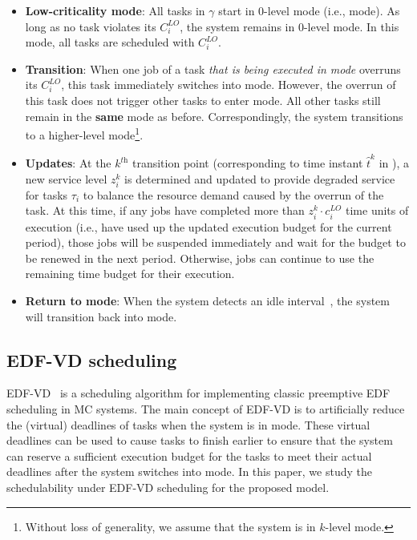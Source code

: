 \documentclass[10pt,journal,compsoc]{IEEEtran}
\begin{document}
\begin{itemize}
\item \textbf{Low-criticality mode}: All tasks in $\gamma$ start in $0$-level \hi mode (i.e., \lo mode). As long as no \hi task violates its $C_i^{LO}$, the system remains in $0$-level \hi mode. In this mode, all tasks are scheduled with $C_i^{LO}$. 
\item \textbf{Transition}: When one job of a \hi task \textit{that is being executed in \lo mode} overruns its $C_i^{LO}$, this \hi task immediately switches into \hi mode. However, the overrun of this task does not trigger other \hi tasks to enter \hi mode. All other \hi tasks still remain in the \textbf{same} mode as before. Correspondingly, the system transitions to a higher-level \hi mode\footnote{Without loss of generality, we assume that the system is in $k$-level \hi mode.}.
\item \textbf{Updates}: At the $k^{\textit{th}}$ transition point (corresponding to time instant $\hat{t}^{k}$ in ), a new service level $z_i^{k}$ is determined and updated to provide degraded service for \lo tasks $\tau_i$ to balance the resource demand caused by the overrun of the \hi task. At this time, if any \lo jobs have completed more than $z_i^{k}\cdot{c_i^{LO}}$ time units of execution (i.e., have used up the updated execution budget for the current period), those jobs will be suspended immediately and wait for the budget to be renewed in the next period. Otherwise, \lo jobs can continue to use the remaining time budget for their execution.
\item \textbf{Return to \lo mode}: When the system detects an idle interval~\cite{burns2013towards,Back}, the system will transition back into \lo mode.  
\end{itemize}

\subsection{EDF-VD scheduling}
EDF-VD~\cite{Baruah2012,sanjoyACM} is a scheduling algorithm for implementing classic preemptive EDF scheduling in MC systems. The main concept of EDF-VD is to artificially reduce the (virtual) deadlines of \hi tasks when the system is in \lo mode. These virtual deadlines can be used to cause \hi tasks to finish earlier to ensure that the system can reserve a sufficient execution budget for the \hi tasks to meet their actual deadlines after the system switches into \hi mode. In this paper, we study the schedulability under EDF-VD scheduling for the proposed \FMC model. 
\end{document}
